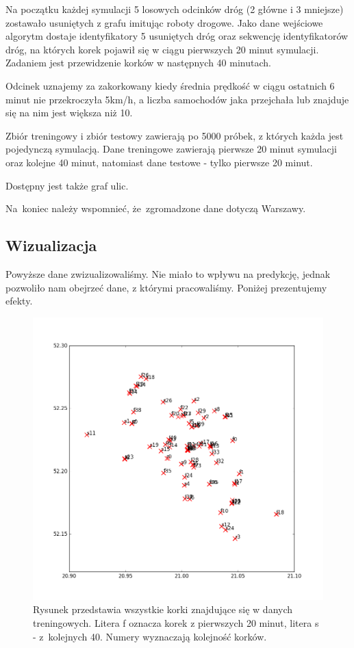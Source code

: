 \documentclass[a4paper,12pt]{mwart}
\begin{document}
Na początku każdej symulacji 5 losowych odcinków dróg (2 główne i 3 mniejsze) zostawało usuniętych z grafu imitując roboty drogowe. Jako dane wejściowe algorytm dostaje identyfikatory 5 usuniętych dróg oraz sekwencję identyfikatorów dróg, na których korek pojawił się w ciągu pierwszych 20 minut symulacji. Zadaniem jest przewidzenie korków w następnych 40 minutach.

Odcinek uznajemy za zakorkowany kiedy średnia prędkość w ciągu ostatnich 6 minut nie przekroczyła 5km/h, a liczba samochodów jaka przejchała lub znajduje się na nim jest większa niż 10.

Zbiór treningowy i zbiór testowy zawierają po 5000 próbek, z których każda jest pojedynczą symulacją. Dane treningowe zawierają pierwsze 20 minut symulacji oraz kolejne 40 minut, natomiast dane testowe - tylko pierwsze 20 minut.

Dostępny jest także graf ulic.

Na~koniec należy wspomnieć, że~zgromadzone dane dotyczą Warszawy.

\subsection{Wizualizacja}
Powyższe dane zwizualizowaliśmy. Nie miało to wpływu na predykcję, jednak pozwoliło nam obejrzeć dane, z którymi pracowaliśmy. Poniżej prezentujemy efekty.

\begin{figure}[h]
\centerline{\includegraphics[width=\textwidth]{figures/jams.png}}
\caption{Rysunek przedstawia wszystkie korki znajdujące się w danych treningowych. Litera f oznacza korek z pierwszych 20 minut, litera s - z~kolejnych 40. Numery wyznaczają kolejność korków.}
\end{figure}
\end{document}
